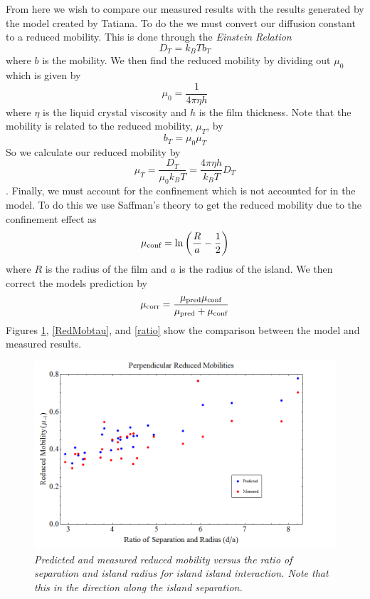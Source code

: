 \documentclass[11pt]{article}
\begin{document}
From here we wish to compare our measured results with the results generated by the model created by Tatiana. To do the we must convert our diffusion constant to a reduced mobility. This is done through the \emph{Einstein Relation}
\begin{equation}
D_T = k_BTb_T
\end{equation}
where $b$ is the mobility. We then find the reduced mobility by dividing out $\mu_0$ which is given by
$$\mu_0 = \frac{1}{4\pi\eta h}$$
where $\eta$ is the liquid crystal viscosity and $h$ is the film thickness. Note that the mobility is related to the reduced mobility, $\mu_T$, by
$$b_T = \mu_0\mu_T$$
So we calculate our reduced mobility by
$$\mu_T = \frac{D_T}{\mu_0k_BT} = \frac{4\pi\eta h}{k_BT}D_T$$.
Finally, we must account for the confinement which is not accounted for in the model. To do this we use Saffman's theory to get the reduced mobility due to the confinement effect as
$$\mu_{\textnormal{conf}} = \ln\left(\frac{R}{a}-\frac{1}{2}\right)$$
where $R$ is the radius of the film and $a$ is the radius of the island. We then correct the models prediction by 
$$\mu_{\textnormal{corr}} = \frac{\mu_{\textnormal{pred}}\mu_{\textnormal{conf}}}{\mu_{\textnormal{pred}}+\mu_{\textnormal{conf}}}$$
Figures \ref{RedMobd}, \ref{RedMobtau}, and \ref{ratio} show the comparison between the model and measured results.

\begin{figure}
\centering
\includegraphics[scale=0.4]{Images/2IslandRedMobPerp.png}
\caption{\textit{Predicted and measured reduced mobility versus the ratio of separation and island radius for island island interaction. Note that this in the direction along the island separation.}}
\label{RedMobd}
\end{figure}
\end{document}
